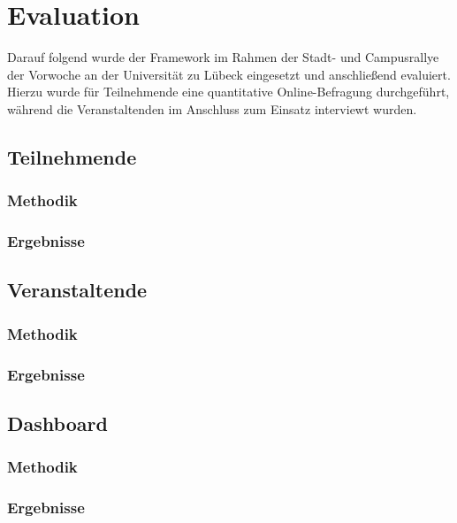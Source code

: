 \chapter{Evaluation}

Darauf folgend wurde der Framework im Rahmen der Stadt- und Campusrallye der
Vorwoche an der Universität zu Lübeck eingesetzt und anschließend evaluiert.
Hierzu wurde für Teilnehmende eine quantitative Online-Befragung durchgeführt,
während die Veranstaltenden im Anschluss zum Einsatz interviewt wurden.

\section{Teilnehmende}

\subsection{Methodik}


\subsection{Ergebnisse}

\section{Veranstaltende}

\subsection{Methodik}

\subsection{Ergebnisse}


\section{Dashboard}

\subsection{Methodik}

\subsection{Ergebnisse}